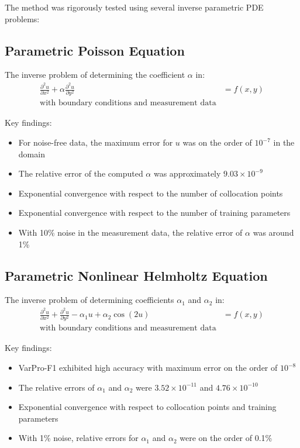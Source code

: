 \documentclass[11pt,a4paper]{article}
\begin{document}
The method was rigorously tested using several inverse parametric PDE problems:

\subsection{Parametric Poisson Equation}

The inverse problem of determining the coefficient $\alpha$ in:
\begin{align}
\frac{\partial^2 u}{\partial x^2} + \alpha \frac{\partial^2 u}{\partial y^2} &= f(x,y) \\
\text{with boundary conditions and measurement data}
\end{align}

Key findings:
\begin{itemize}
    \item For noise-free data, the maximum error for $u$ was on the order of $10^{-7}$ in the domain
    \item The relative error of the computed $\alpha$ was approximately $9.03 \times 10^{-9}$
    \item Exponential convergence with respect to the number of collocation points
    \item Exponential convergence with respect to the number of training parameters
    \item With 10\% noise in the measurement data, the relative error of $\alpha$ was around 1\%
\end{itemize}

\subsection{Parametric Nonlinear Helmholtz Equation}

The inverse problem of determining coefficients $\alpha_1$ and $\alpha_2$ in:
\begin{align}
\frac{\partial^2 u}{\partial x^2} + \frac{\partial^2 u}{\partial y^2} - \alpha_1 u + \alpha_2 \cos(2u) &= f(x,y) \\
\text{with boundary conditions and measurement data}
\end{align}

Key findings:
\begin{itemize}
    \item VarPro-F1 exhibited high accuracy with maximum error on the order of $10^{-8}$
    \item The relative errors of $\alpha_1$ and $\alpha_2$ were $3.52 \times 10^{-11}$ and $4.76 \times 10^{-10}$
    \item Exponential convergence with respect to collocation points and training parameters
    \item With 1\% noise, relative errors for $\alpha_1$ and $\alpha_2$ were on the order of 0.1\%
\end{itemize}
\end{document}
